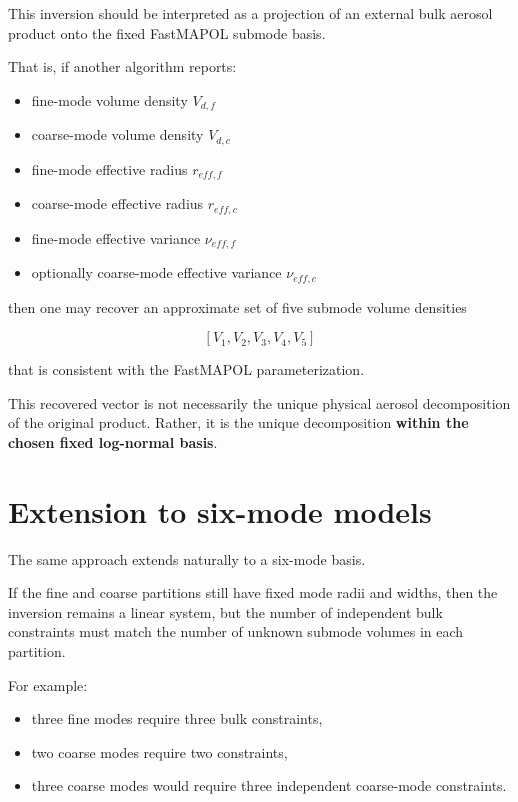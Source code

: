 \documentclass[
  11pt,
  letterpaper,
]{scrreprt}
\providecommand{\tightlist}{%
  \setlength{\itemsep}{0pt}\setlength{\parskip}{0pt}}
\begin{document}
This inversion should be interpreted as a projection of an external bulk
aerosol product onto the fixed FastMAPOL submode basis.

That is, if another algorithm reports:

\begin{itemize}
\tightlist
\item
  fine-mode volume density \(V_{d,f}\)
\item
  coarse-mode volume density \(V_{d,c}\)
\item
  fine-mode effective radius \(r_{eff,f}\)
\item
  coarse-mode effective radius \(r_{eff,c}\)
\item
  fine-mode effective variance \(\nu_{eff,f}\)
\item
  optionally coarse-mode effective variance \(\nu_{eff,c}\)
\end{itemize}

then one may recover an approximate set of five submode volume densities

\[
[V_1,V_2,V_3,V_4,V_5]
\]

that is consistent with the FastMAPOL parameterization.

This recovered vector is not necessarily the unique physical aerosol
decomposition of the original product. Rather, it is the unique
decomposition \textbf{within the chosen fixed log-normal basis}.

\section{Extension to six-mode
models}\label{extension-to-six-mode-models}

The same approach extends naturally to a six-mode basis.

If the fine and coarse partitions still have fixed mode radii and
widths, then the inversion remains a linear system, but the number of
independent bulk constraints must match the number of unknown submode
volumes in each partition.

For example:

\begin{itemize}
\tightlist
\item
  three fine modes require three bulk constraints,
\item
  two coarse modes require two constraints,
\item
  three coarse modes would require three independent coarse-mode
  constraints.
\end{itemize}
\end{document}
